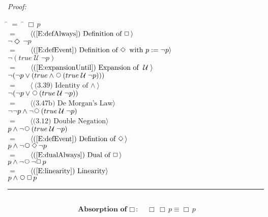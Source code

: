 \documentclass[fleqn, leqno]{article}
\newcommand{\lgap}{2pt}                             %
\newcommand{\mymathindent}{24pt}                    %
\newcommand{\Until}{\;\mathcal{U}\;}
\newcommand{\Next}{\;\,\text{\raisebox{3.5pt}{\circle{6}}}}
\newcommand{\Event}{\Diamond\,}
\newcommand{\Always}{\Box\,}
\newcommand{\myqed}{\hfill\rule[-.23ex]{1.2ex}{2.0ex}}
\newcommand{\Gll} {\langle}                         %
\newcommand{\Ggg} {\rangle}                         %
\newcommand{\Hint}[1]     {\ \ \ $\Gll              \mbox{#1} \Ggg$ }   %
\begin{document}
\emph{Proof:}
\begin{tabbing}
\hspace{\mymathindent} \= $= \;$ \= \kill
  \> \>   $\Always p$\\[\lgap]
  \> $=$  \>  \Hint{(\ref{E:defAlways}) Definition of $\Always$}\\[\lgap]
  \> \>   $\lnot\Event\lnot p$\\[\lgap]
  \> $=$  \>  \Hint{(\ref{E:defEvent}) Definition of $\Event$ with $p := \lnot p$}\\[\lgap]
  \> \>   $\lnot(true \Until \lnot p)$\\[\lgap]
  \> $=$  \>  \Hint{(\ref{E:expansionUntil}) Expansion of $\Until$}\\[\lgap]
  \> \>   $\lnot(\lnot p \lor (true \land \Next(true \Until \lnot p)))$\\[\lgap]
  \> $=$  \>  \Hint{(3.39) Identity of $\land$}\\[\lgap]
  \> \>   $\lnot(\lnot p \lor \Next(true \Until \lnot p))$\\[\lgap]
  \> $=$  \>  \Hint{(3.47b) De Morgan's Law}\\[\lgap]
  \> \>   $\lnot\lnot p \land \lnot\Next(true \Until \lnot p)$\\[\lgap]
  \> $=$  \>  \Hint{(3.12) Double Negation}\\[\lgap]
  \> \>   $p \land \lnot\Next(true \Until \lnot p)$\\[\lgap]
  \> $=$  \>  \Hint{(\ref{E:defEvent}) Defintion of $\Event$}\\[\lgap]
  \> \>   $p \land \lnot\Next\Event\lnot p$\\[\lgap]
  \> $=$  \>  \Hint{(\ref{E:dualAlways}) Dual of $\Always$}\\[\lgap]
  \> \>   $p \land \lnot\Next\lnot\Always p$\\[\lgap]
  \> $=$  \>  \Hint{(\ref{E:linearity}) Linearity}\\[\lgap]
  \> \>   $p \land \Next\Always p$\\[\lgap]
\end{tabbing}
\myqed\\[\lgap]


\begin{equation}\label{E:IdemAlways}
\textbf{Absorption of $\Always$:}\quad \Always\Always p \equiv \Always p
\end{equation}
\end{document}
